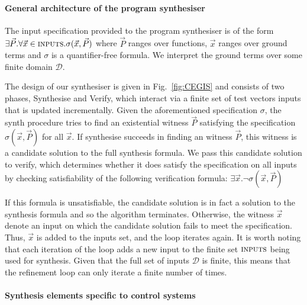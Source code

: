 \documentclass{sig-alternate-05-2015}
\newcommand{\blue}[1]{{\color{blue}#1}}
\newcommand{\red}[1]{{\color{red}#1}}
\begin{document}

\paragraph{General architecture of the program synthesiser}
%
% 
The input specification provided to the program synthesiser is of the
form $\exists \vec{P} . \forall \vec{x} \in \text{\sc inputs}
. \sigma(\vec{x}, \vec{P})$ where $\vec{P}$ ranges over functions,
$\vec{x}$ ranges over ground terms and $\sigma$ is a quantifier-free
formula.  We interpret the ground terms over some finite domain
$\mathcal{D}$.

The design of our synthesiser is given in Fig.~\ref{fig:CEGIS} and
consists of two phases, {\sc Synthesise} and {\sc Verify}, which
interact via a finite set of test vectors {\sc inputs} that is updated
incrementally.  Given the aforementioned specification $\sigma$, the
{\sc synth} procedure tries to find an existential witness $\vec{P}$
satisfying the specification $\sigma(\vec{x}, \vec{P})$ for all
$\vec{x}$.
%
If {\sc synthesise} succeeds in finding an witness $\vec{P}$, this
witness is a candidate solution to the full synthesis formula.  We
pass this candidate solution to {\sc verify}, which determines whether
it does satisfy the specification on all inputs by checking
satisfiability of the following verification formula:
%
$\exists \vec{x} . \lnot \sigma(\vec{x}, \vec{P})$

If this formula is unsatisfiable, the candidate solution is in fact a
solution to the synthesis formula and so the algorithm terminates.
Otherwise, the witness $\vec{x}$ denote an input on which the
candidate solution fails to meet the specification.  Thus, $\vec{x}$ is
added to the {\sc inputs} set, and the loop iterates again.  It is
worth noting that each iteration of the loop adds a new input to the
finite set $\text{\sc inputs}$ being used for synthesis.  Given that
the full set of inputs $\mathcal{D}$
is finite, this means that the refinement loop
can only iterate a finite number of times.

\paragraph{Synthesis elements specific to control systems}
\end{document}
